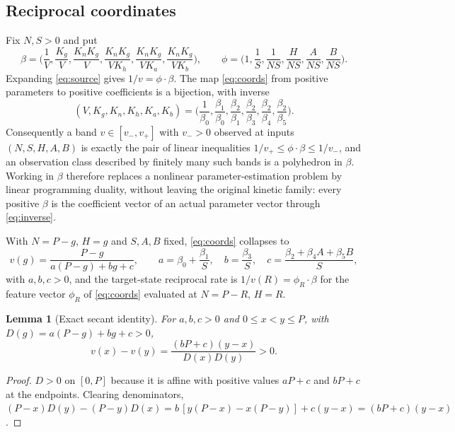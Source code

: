 \documentclass[11pt]{article}
\newtheorem{lemma}[theorem]{Lemma}
\theoremstyle{definition}
\begin{document}
\subsection{Reciprocal coordinates}
Fix $N,S>0$ and put
\begin{equation}\label{eq:coords}
  \beta=\Big(\frac1V,\frac{K_g}V,\frac{K_nK_g}V,
  \frac{K_nK_g}{VK_h},\frac{K_nK_g}{VK_a},\frac{K_nK_g}{VK_b}\Big),
  \qquad
  \phi=\Big(1,\frac1S,\frac1{NS},\frac H{NS},\frac A{NS},\frac B{NS}\Big).
\end{equation}
Expanding \eqref{eq:source} gives $1/v=\phi\cdot\beta$. The map
\eqref{eq:coords} from positive parameters to positive coefficients is a
bijection, with inverse
\begin{equation}\label{eq:inverse}
  (V,K_g,K_n,K_h,K_a,K_b)
  =\Big(\frac1{\beta_0},\frac{\beta_1}{\beta_0},\frac{\beta_2}{\beta_1},
  \frac{\beta_2}{\beta_3},\frac{\beta_2}{\beta_4},\frac{\beta_2}{\beta_5}\Big).
\end{equation}
Consequently a band $v\in[v_-,v_+]$ with $v_->0$ observed at inputs
$(N,S,H,A,B)$ is exactly the pair of linear inequalities
$1/v_+\le\phi\cdot\beta\le1/v_-$, and an observation class described by finitely
many such bands is a polyhedron in $\beta$. Working in $\beta$ therefore
replaces a nonlinear parameter-estimation problem by linear programming
duality, without leaving the original kinetic family: every positive $\beta$ is
the coefficient vector of an actual parameter vector through
\eqref{eq:inverse}.

With $N=P-g$, $H=g$ and $S,A,B$ fixed, \eqref{eq:coords} collapses to
\begin{equation}\label{eq:scalarrate}
  v(g)=\frac{P-g}{a(P-g)+bg+c},\qquad
  a=\beta_0+\frac{\beta_1}S,\quad b=\frac{\beta_3}S,\quad
  c=\frac{\beta_2+\beta_4A+\beta_5B}S,
\end{equation}
with $a,b,c>0$, and the target-state reciprocal rate is
$1/v(R)=\phi_R\cdot\beta$ for the feature vector $\phi_R$ of
\eqref{eq:coords} evaluated at $N=P-R$, $H=R$.

\begin{lemma}[Exact secant identity]\label{lem:secant}
For $a,b,c>0$ and $0\le x<y\le P$, with $D(g)=a(P-g)+bg+c>0$,
\begin{equation}\label{eq:secant}
  v(x)-v(y)=\frac{(bP+c)(y-x)}{D(x)D(y)}>0 .
\end{equation}
\end{lemma}
\begin{proof}
$D>0$ on $[0,P]$ because it is affine with positive values
$aP+c$ and $bP+c$ at the endpoints. Clearing denominators,
$(P-x)D(y)-(P-y)D(x)=b\,[y(P-x)-x(P-y)]+c(y-x)=(bP+c)(y-x)$.
\end{proof}
\end{document}
